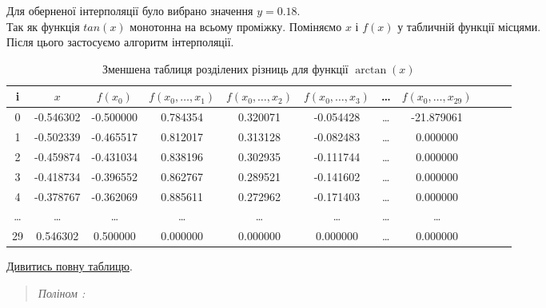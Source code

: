 \documentclass[a4paper, 12pt]{article}
\begin{document}
Для оберненої інтерполяції було вибрано значення \( y = 0.18 \). \\
Так як функція \(tan(x)\) монотонна на всьому проміжку. Поміняємо \(x\) і \(f(x)\) у табличній функції місцями. \\
Після цього застосуємо алгоритм інтерполяції. \\

\hspace*{-2cm}
\begin{table}[ht]
    \centering
    \begin{tabular}{|c|c|c|c|c|c|c|c|c|c|c|}
        \hline
        \textbf{i} & \( x \) & \( f(x_0) \) & \( f(x_0, \ldots, x_1) \) & \( f(x_0, \ldots, x_2) \) & \( f(x_0, \ldots, x_3) \) & \ldots & \( f(x_0, \ldots, x_{29}) \) \\
        \hline
	0 & -0.546302 & -0.500000 &  0.784354 & 0.320071 & -0.054428 & \ldots & -21.879061 \\
	1 & -0.502339 & -0.465517 & 0.812017 & 0.313128 & -0.082483 & \ldots & 0.000000 \\
	2 & -0.459874 & -0.431034 & 0.838196 & 0.302935 & -0.111744 & \ldots & 0.000000 \\
	3 & -0.418734 & -0.396552 & 0.862767 & 0.289521 & -0.141602 & \ldots & 0.000000 \\
	4 & -0.378767 & -0.362069 & 0.885611 & 0.272962 & -0.171403 & \ldots & 0.000000 \\
        \hline
		\ldots & \ldots & \ldots & \ldots & \ldots & \ldots & \ldots & \ldots \\
        \hline
        29 & 0.546302 & 0.500000 & 0.000000 & 0.000000 & 0.000000 & \ldots & 0.000000 \\
        \hline
    \end{tabular}
    \caption{Зменшена таблиця розділених різниць для функції \( \arctan(x) \)}
\end{table}

\hyperref[sec:table2]{Дивитись повну таблицю}.

\begin{quote}
\textit{Поліном :} 
\end{quote}
\end{document}
